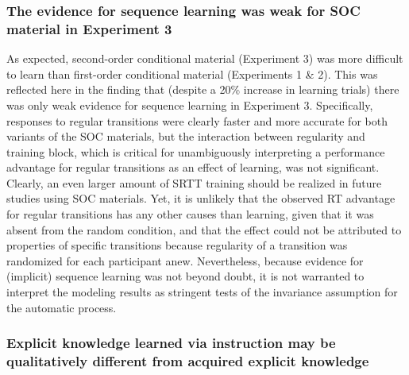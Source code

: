 \documentclass[english,,man]{apa6}
\begin{document}
\hypertarget{the-evidence-for-sequence-learning-was-weak-for-soc-material-in-experiment-3}{%
\subsubsection{The evidence for sequence learning was weak for SOC material in Experiment 3}\label{the-evidence-for-sequence-learning-was-weak-for-soc-material-in-experiment-3}}

As expected, second-order conditional material (Experiment 3) was more difficult to learn than first-order conditional material (Experiments 1 \& 2).
This was reflected here in the finding that (despite a 20\% increase in learning trials) there was only weak evidence for sequence learning in Experiment 3.
Specifically, responses to regular transitions were clearly faster and more accurate for both variants of the SOC materials, but the interaction between regularity and training block, which is critical for unambiguously interpreting a performance advantage for regular transitions as an effect of learning, was not significant.
Clearly, an even larger amount of SRTT training should be realized in future studies using SOC materials.
Yet, it is unlikely that the observed RT advantage for regular transitions has any other causes than learning, given that it was absent from the random condition, and that the effect could not be attributed to properties of specific transitions because regularity of a transition was randomized for each participant anew.
Nevertheless, because evidence for (implicit) sequence learning was not beyond doubt, it is not warranted to interpret the modeling results as stringent tests of the invariance assumption for the automatic process.

\hypertarget{explicit-knowledge-learned-via-instruction-may-be-qualitatively-different-from-acquired-explicit-knowledge}{%
\subsubsection{Explicit knowledge learned via instruction may be qualitatively different from acquired explicit knowledge}\label{explicit-knowledge-learned-via-instruction-may-be-qualitatively-different-from-acquired-explicit-knowledge}}
\end{document}
